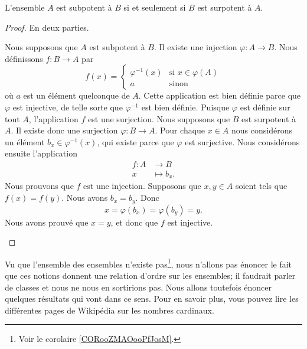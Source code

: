 \begin{proposition}      \label{PROPooWSXTooMQPcNG}
	L'ensemble \( A\) est subpotent à \( B\) si et seulement si \( B\) est surpotent à \( A\).
\end{proposition}

\begin{proof}
	En deux parties.
	\begin{subproof}
		\spitem[\( \Rightarrow\)]
		Nous supposons que \( A\) est subpotent à \( B\). Il existe une injection \( \varphi\colon A\to B\). Nous définissons \( f\colon B\to A\) par
		\begin{equation}
			f(x)=\begin{cases}
				\varphi^{-1}(x) & \text{si } x\in\varphi(A) \\
				a               & \text{sinon }
			\end{cases}
		\end{equation}
		où \( a\) est un élément quelconque de \( A\). Cette application est bien définie parce que \( \varphi\) est injective, de telle sorte que \( \varphi^{-1}\) est bien définie. Puisque \( \varphi\) est définie sur tout \( A\), l'application \( f\) est une surjection.
		\spitem[\( \Leftarrow\)]
		Nous supposons que \( B\) est surpotent à \( A\). Il existe donc une surjection \( \varphi\colon B\to A\). Pour chaque \( x\in A\) nous considérons un élément \( b_x\in \varphi^{-1}(x)\), qui existe parce que \( \varphi\) est surjective. Nous considérons ensuite l'application
		\begin{equation}
			\begin{aligned}
				f\colon A & \to B        \\
				x         & \mapsto b_x.
			\end{aligned}
		\end{equation}
		Nous prouvons que \( f\) est une injection. Supposons que \( x,y\in A\) soient tels que \( f(x)=f(y)\). Nous avons \( b_x=b_y\). Donc
		\begin{equation}
			x=\varphi(b_x)=\varphi(b_y)=y.
		\end{equation}
		Nous avons prouvé que \( x=y\), et donc que \( f\) est injective.
	\end{subproof}
\end{proof}

Vu que l'ensemble des ensembles n'existe pas\footnote{Voir le corolaire \ref{CORooZMAOooPfJosM}.}, nous n'allons pas énoncer le fait que ces notions donnent une relation d'ordre sur les ensembles; il faudrait parler de classes et nous ne nous en sortirions pas. Nous allons toutefois énoncer quelques résultats qui vont dans ce sens. Pour en savoir plus, vous pouvez lire les différentes pages de Wikipédia sur les nombres cardinaux.

